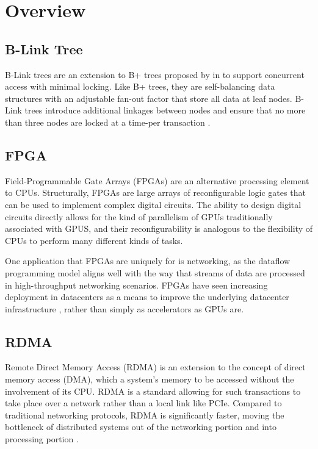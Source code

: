 \section{Overview}

\subsection{B-Link Tree}

B-Link trees are an extension to B+ trees proposed by \citeauthor{b-link} in \citeyear{b-link} to support concurrent access with minimal locking. Like B+ trees, they are self-balancing data structures with an adjustable fan-out factor that store all data at leaf nodes. B-Link trees introduce additional linkages between nodes and ensure that no more than three nodes are locked at a time-per transaction \cite{b-link}.


\subsection{FPGA}

Field-Programmable Gate Arrays (FPGAs) are an alternative processing element to CPUs. Structurally, FPGAs are large arrays of reconfigurable logic gates that can be used to implement complex digital circuits. The ability to design digital circuits directly allows for the kind of parallelism of GPUs traditionally associated with GPUS, and their reconfigurability is analogous to the flexibility of CPUs to perform many different kinds of tasks.

One application that FPGAs are uniquely for is networking, as the dataflow programming model aligns well with the way that streams of data are processed in high-throughput networking scenarios. FPGAs have seen increasing deployment in datacenters as a means to improve the underlying datacenter infrastructure \cite{bobda-trets-2022,fang-vldb-2020}, rather than simply as accelerators as GPUs are.


\subsection{RDMA}

Remote Direct Memory Access (RDMA) is an extension to the concept of direct memory access (DMA), which a system's memory to be accessed without the involvement of its CPU. RDMA is a standard allowing for such transactions to take place over a network rather than a local link like PCIe. Compared to traditional networking protocols, RDMA is significantly faster, moving the bottleneck of distributed systems out of the networking portion and into processing portion \cite{binnig-vldb-2016}.

